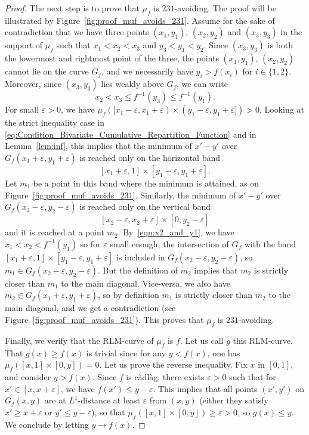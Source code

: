 \documentclass[a4paper,11pt]{amsart}
\newcommand{\eps}{\varepsilon}
\theoremstyle{definition}
\begin{document}
\begin{proof}
The next step is to prove that $\mu_f$ is $231$-avoiding. The proof will be illustrated by Figure~\ref{fig:proof_muf_avoids_231}.
Assume for the sake of contradiction that we have three points $(x_1,y_1)$, $(x_2,y_2)$ and $(x_3,y_3)$ in the support of $\mu_f$ such that $x_1<x_2<x_3$ and $y_3<y_1<y_2$.
Since $(x_3,y_3)$ is both the lowermost and rightmost point of the three,
the points $(x_1,y_1)$, $(x_2,y_2)$ cannot lie on the curve $G_f$,
and we necessarily have $y_i > f(x_i)$ for $i \in \{1,2\}$. Moreover, since $(x_3, y_3)$ lies weakly above $G_f$, we can write
\begin{equation}\label{eqn:x2_and_y1}
x_2<x_3 \leq f^{-1}(y_3) \leq f^{-1}(y_1).
\end{equation}
For small $\eps>0$, we have $\mu_f([x_1-\eps,x_1+\eps) \times (y_1-\eps,y_1+\eps])>0$.
Looking at the strict inequality case in \eqref{eq:Condition_Bivariate_Cumulative_Repartition_Function} and in Lemma~\ref{lem:inf}, this implies that the minimum of $x'-y'$ over $G_f(x_1+\eps,y_1+\eps)$ is reached only on the horizontal band
\[
[x_1+\eps,1] \times [y_1-\eps,y_1+\eps].
\]
Let $m_1$ be a point in this band where the minimum is attained, as on Figure~\ref{fig:proof_muf_avoids_231}. Similarly, the minimum of $x'-y'$ over $G_f(x_2-\eps,y_2-\eps)$ is reached only on the vertical band
\[ [x_2-\eps,x_2+\eps] \times [0,y_2-\eps]\]
and it is reached at a point $m_2$.
By~\eqref{eqn:x2_and_y1}, we have $x_1<x_2<f^{-1}(y_1)$ so for $\eps$ small enough,
the intersection of $G_f$ with the band $[x_1+\eps,1] \times [y_1-\eps,y_1+\eps]$ is included in $G_f(x_2-\eps,y_2-\eps)$, so $m_1 \in G_f(x_2-\eps,y_2-\eps)$. But the definition of $m_2$ implies that $m_2$ is strictly closer than $m_1$ to the main diagonal. Vice-versa, we also have $m_2 \in G_f(x_1+\eps,y_1+\eps)$, so by definition $m_1$ is strictly closer than $m_2$ to the main diagonal, and we get a contradiction (see Figure~\ref{fig:proof_muf_avoids_231}). This proves that $\mu_f$ is $231$-avoiding.


Finally, we verify that the RLM-curve of $\mu_f$ is $f$. Let us call $g$ this RLM-curve.
That $g(x) \ge f(x)$ is trivial since for any $y < f(x)$, one has $\mu_f([x,1] \times [0,y])=0$. Let us prove the reverse inequality.
Fix $x$ in $[0,1]$, and consider $y>f(x)$. Since $f$ is càdlàg, there exists $\eps>0$ such that for $x' \in [x,x+\eps]$, we have $f(x') \le y-\eps$. This implies that all points $(x',y')$ on $G_f(x,y)$ are at $L^1$-distance at least $\eps$ from $(x,y)$ 
(either they satisfy $x' \ge x+\eps$ or $y'\le y-\eps$),
so that $\mu_f([x,1] \times [0,y]) \ge \eps >0$, so $g(x) \le y$. We conclude by letting $y \to f(x)$.
\end{proof}
\end{document}

